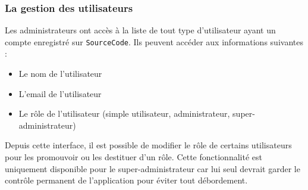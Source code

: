 \subsubsection{La gestion des utilisateurs}

Les administrateurs ont accès à la liste de tout type d'utilisateur ayant un compte enregistré sur \texttt{SourceCode}. Ils peuvent accéder aux informations suivantes :

\begin{itemize}
    \item Le nom de l'utilisateur
    \item L'email de l'utilisateur
    \item Le rôle de l'utilisateur (simple utilisateur, administrateur, super-administrateur)
\end{itemize}

Depuis cette interface, il est possible de modifier le rôle de certains utilisateurs pour les promouvoir ou les destituer d'un rôle. Cette fonctionnalité est uniquement disponible pour le super-administrateur car lui seul devrait garder le contrôle permanent de l'application pour éviter tout débordement.
